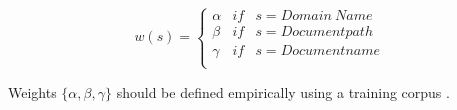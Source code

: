 \begin{equation}\label{eq:jebary_url_weigh_cngrams_2}
	w(s) = \left\{
    	\begin{array}{lll}
        	\alpha & if & s = Domain\ Name \\
            \beta & if & s = Document path \\
            \gamma & if & s = Document name \\
         \end{array}
  \right.
\end{equation}

Weights $\{\alpha,\beta,\gamma\}$ should be defined empirically using a training corpus \parencite{jebari2014pureURL}. 






